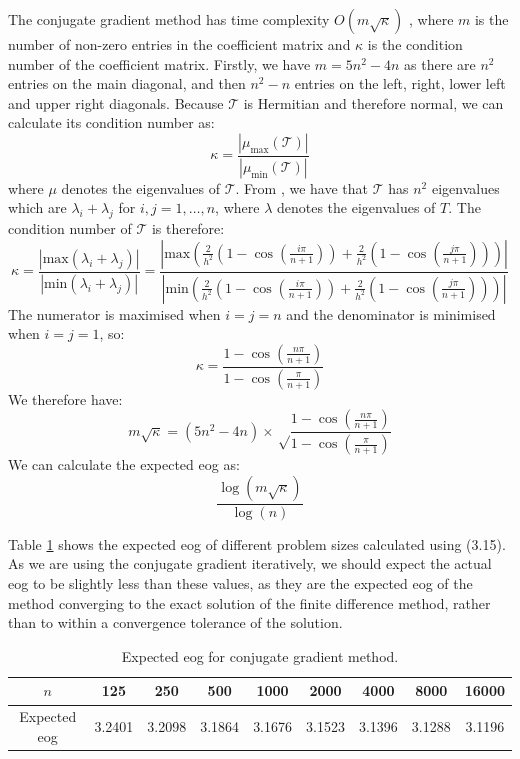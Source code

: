 \documentclass[11pt]{article}
\numberwithin{equation}{section}
\begin{document}
The conjugate gradient method has time complexity $O(m\sqrt{\kappa})$ \cite{Shewchuk}, where $m$ is the number of non-zero entries in the coefficient matrix and $\kappa$ is the condition number of the coefficient matrix. Firstly, we have $m=5n^2 - 4n$ as there are $n^2$ entries on the main diagonal, and then $n^2 - n$ entries on the left, right, lower left and upper right diagonals. Because $\mathcal{T}$ is Hermitian and therefore normal, we can calculate its condition number as:
\begin{equation}
\kappa = \frac{|\mu_{\text{max}}(\mathcal{T})|}{|\mu_{\text{min}}(\mathcal{T})|}
\end{equation}
where $\mu$ denotes the eigenvalues of $\mathcal{T}$. From \cite{Laub}, we have that $\mathcal{T}$ has $n^2$ eigenvalues which are $\lambda_i + \lambda_j$ for $i,j=1,\dots,n$, where $\lambda$ denotes the eigenvalues of $T$. The condition number of $\mathcal{T}$ is therefore:
\begin{equation}
\kappa = \frac{|\text{max} (\lambda_i + \lambda_j)|}{|\text{min}(\lambda_i + \lambda_j)|} 
= \frac{\left|\text{max} \left(\frac{2}{h^2} \left(1-\cos \left( \frac{i\pi}{n+1} \right) \right) 
+ \frac{2}{h^2} \left( 1-\cos \left( \frac{j\pi}{n+1} \right) \right) \right) \right|}
{\left|\text{min} \left( \frac{2}{h^2} \left( 1-\cos \left( \frac{i\pi}{n+1} \right) \right) 
+ \frac{2}{h^2} \left( 1-\cos \left( \frac{j\pi}{n+1} \right) \right) \right) \right|}
\end{equation}
The numerator is maximised when $i=j=n$ and the denominator is minimised when $i=j=1$, so:
\begin{equation}
\kappa = \frac{1-\cos \left(\frac{n \pi}{n+1} \right)}{1-\cos \left(\frac{\pi}{n+1} \right)}
\end{equation}
We therefore have:
\begin{equation}
m\sqrt{\kappa} = (5n^2-4n) \times \sqrt \frac{1-\cos \left(\frac{n \pi}{n+1} \right)}{1-\cos \left(\frac{\pi}{n+1} \right)}
\end{equation}
We can calculate the expected eog as:
\begin{equation}
\frac{\log(m \sqrt \kappa)}{\log(n)}
\end{equation}

Table \ref{table:cg eog} shows the expected eog of different problem sizes calculated using (3.15). As we are using the conjugate gradient iteratively, we should expect the actual eog to be slightly less than these values, as they are the expected eog of the method converging to the exact solution of the finite difference method, rather than to within a convergence tolerance of the solution.
\begin{table}[H]
\centering
\begin{tabular}{|c|c|c|c|c|c|c|c|c|}
\hline
$n$ & 125 & 250 & 500 & 1000 & 2000 & 4000 & 8000 & 16000 \\
\hline
Expected eog & 3.2401 & 3.2098 & 3.1864 & 3.1676 & 3.1523 & 3.1396 & 3.1288 & 3.1196 \\
\hline
\end{tabular}
\caption{Expected eog for conjugate gradient method.}
\label{table:cg eog}
\end{table}
\end{document}
